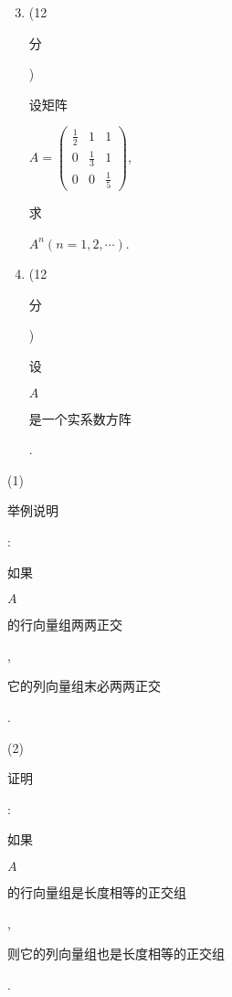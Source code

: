 \documentclass[10pt]{article}
\begin{document}
\begin{enumerate}
  \setcounter{enumi}{2}
  \item (12 \begin{CJK}{UTF8}{mj}分\end{CJK}) \begin{CJK}{UTF8}{mj}设矩阵\end{CJK} $A=\left(\begin{array}{ccc}\frac{1}{2} & 1 & 1 \\ 0 & \frac{1}{3} & 1 \\ 0 & 0 & \frac{1}{5}\end{array}\right)$, \begin{CJK}{UTF8}{mj}求\end{CJK} $A^{n}(n=1,2, \cdots)$.

  \item (12 \begin{CJK}{UTF8}{mj}分\end{CJK}) \begin{CJK}{UTF8}{mj}设\end{CJK} $A$ \begin{CJK}{UTF8}{mj}是一个实系数方阵\end{CJK}.

\end{enumerate}
(1) \begin{CJK}{UTF8}{mj}举例说明\end{CJK}: \begin{CJK}{UTF8}{mj}如果\end{CJK} $A$ \begin{CJK}{UTF8}{mj}的行向量组两两正交\end{CJK}, \begin{CJK}{UTF8}{mj}它的列向量组末必两两正交\end{CJK}.

(2) \begin{CJK}{UTF8}{mj}证明\end{CJK}: \begin{CJK}{UTF8}{mj}如果\end{CJK} $A$ \begin{CJK}{UTF8}{mj}的行向量组是长度相等的正交组\end{CJK}, \begin{CJK}{UTF8}{mj}则它的列向量组也是长度相等的正交组\end{CJK}.
\end{document}
